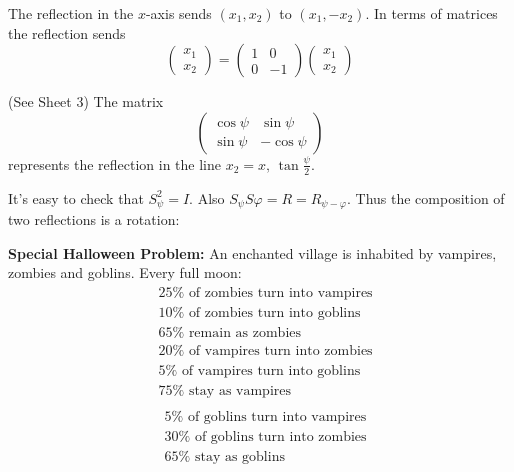 \documentclass[10pt]{scrartcl}
\begin{document}
The reflection in the $x$-axis sends $(x_1,x_2)$ to $(x_1,-x_2)$. In terms of matrices the reflection sends 
\[
  \begin{pmatrix}
  x_1\\ x_2	
  \end{pmatrix}=
  \begin{pmatrix}
  1 & 0 \\ 0 & -1
  \end{pmatrix}\begin{pmatrix}
	x_1 \\ x_2	
	\end{pmatrix}
\]

\begin{definition}(See Sheet 3) The matrix 
\[
  \begin{pmatrix}
  \cos\psi & \sin\psi\\
  \sin\psi & -\cos\psi 	
  \end{pmatrix}
\]
represents the reflection in the line $x_2 = x,\, \tan\frac{\psi}{2}$. 
\end{definition}

It's easy to check that $S_\psi^2 = I$. Also $S_\psi S\varphi = R = R_{\psi - \varphi}$. Thus the composition of two reflections is a rotation:

\begin{center}
\end{center}




\textbf{Special Halloween Problem:} An enchanted village is inhabited by vampires, zombies and goblins. Every full moon: 
\begin{align*}
  &25\% \text{ of zombies turn into vampires}\\
  &10\% \text{ of zombies turn into goblins}\\
  &65\% \text{ remain as zombies}\\[.2cm]
    &20\% \text{ of vampires turn into zombies}\\
  &5\% \text{ of vampires turn into goblins}\\
  &75\% \text{ stay as vampires}\\[0.2cm]
  \end{align*}
\begin{align*}
  &5\% \text{ of goblins turn into vampires}\\
  &30\% \text{ of goblins turn into zombies}\\
  &65\% \text{ stay as goblins}
\end{align*}
\end{document}
